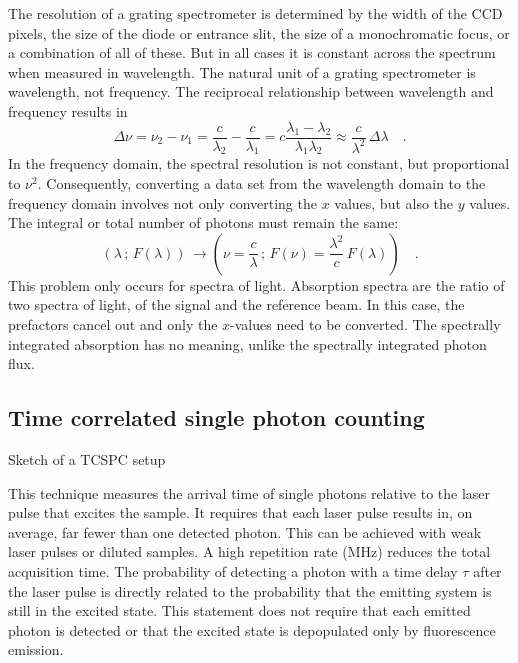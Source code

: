 The resolution of a grating spectrometer is determined by the width of the CCD pixels, the size of the diode or entrance slit, the size of a monochromatic focus, or a combination of all of these. But in all cases it is constant across the spectrum when measured in wavelength. The natural unit of a grating spectrometer is wavelength, not frequency. The reciprocal relationship between wavelength and frequency results in 
\begin{equation}
 \Delta \nu = \nu_2 - \nu_1 = \frac{c}{\lambda_2} - \frac{c}{\lambda_1}  = c \frac{\lambda_1 - \lambda_2}{\lambda_1 \lambda_2} \approx \frac{c}{\lambda^2} \, \Delta \lambda \quad .
\end{equation}
In the frequency domain, the spectral resolution is not constant, but proportional to $\nu^2$. Consequently, converting a data set from the wavelength domain to the frequency domain involves not only converting the $x$ values, but also the $y$ values. The integral or total number of photons must remain the same:
\begin{equation}
 \left( \lambda \, ; \, F(\lambda) \right) \, \rightarrow  \left( \nu = \frac{c}{ \lambda} \, ; \,  F(\nu) = \frac{\lambda^2}{ c } \, F(\lambda) \right)  \quad .
\end{equation}
This problem only occurs for spectra of light. Absorption spectra are the ratio of two spectra of light, of the signal and the reference beam. In this case, the prefactors cancel out and only the $x$-values need to be converted. The spectrally integrated absorption has no meaning, unlike the spectrally integrated photon flux.



\subsection{Time correlated single photon counting}

\begin{marginfigure}
  \caption{Sketch of a TCSPC setup}
\end{marginfigure}

This technique measures the arrival time of single photons relative to the laser pulse that excites the sample. It requires that each laser pulse results in, on average, far fewer than one detected photon. This can be achieved with weak laser pulses or diluted samples. A high repetition rate (MHz) reduces the total acquisition time. The probability of detecting a photon with a time delay $\tau$ after the laser pulse is directly related to the probability that the emitting system is still in the excited state. This statement does not require that each emitted photon is detected or that the excited state is depopulated only by fluorescence emission.


